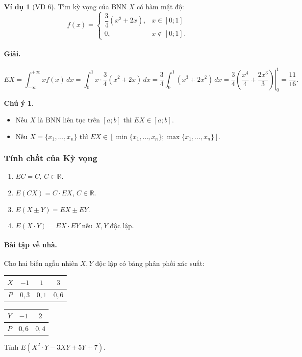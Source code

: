\documentclass[12pt,a4paper]{article}
\theoremstyle{definition}
\newtheorem{vidu}{Ví dụ}[section]
\newtheorem{chuy}{Chú ý}[section]
\begin{document}
\begin{vidu}[VD 6]
Tìm kỳ vọng của BNN $X$ có hàm mật độ:
\[
f(x) = \begin{cases}
\dfrac{3}{4}(x^2 + 2x), & x \in [0; 1] \\
0, & x \notin [0; 1].
\end{cases}
\]

\paragraph{Giải.}
\[
EX = \int_{-\infty}^{+\infty} x f(x)\,dx = \int_0^1 x \cdot \frac{3}{4}(x^2 + 2x)\,dx = \frac{3}{4} \int_0^1 (x^3 + 2x^2)\,dx = \frac{3}{4} \left.\left(\frac{x^4}{4} + \frac{2x^3}{3}\right)\right|_0^1 = \frac{11}{16}.
\]
\end{vidu}

\begin{chuy}
\begin{itemize}
    \item Nếu $X$ là BNN liên tục trên $[a; b]$ thì $EX \in [a; b]$.
    \item Nếu $X = \{x_1, \dots, x_n\}$ thì $EX \in [\min\{x_1, \dots, x_n\}; \max\{x_1, \dots, x_n\}]$.
\end{itemize}
\end{chuy}

\subsubsection{Tính chất của Kỳ vọng}
\begin{enumerate}[label=\arabic*)]
    \item $EC = C$, $C \in \mathbb{R}$.
    \item $E(CX) = C \cdot EX$, $C \in \mathbb{R}$.
    \item $E(X \pm Y) = EX \pm EY$.
    \item $E(X \cdot Y) = EX \cdot EY$ nếu $X, Y$ độc lập.
\end{enumerate}

\paragraph{Bài tập về nhà.} Cho hai biến ngẫu nhiên $X, Y$ độc lập có bảng phân phối xác suất:
\begin{center}
\begin{tabular}{|c|c|c|c|}
\hline
$X$ & $-1$ & $1$ & $3$ \\
\hline
$P$ & $0{,}3$ & $0{,}1$ & $0{,}6$ \\
\hline
\end{tabular}
\qquad
\begin{tabular}{|c|c|c|}
\hline
$Y$ & $-1$ & $2$ \\
\hline
$P$ & $0{,}6$ & $0{,}4$ \\
\hline
\end{tabular}
\end{center}
Tính $E(X^2 \cdot Y - 3XY + 5Y + 7)$.
\end{document}

